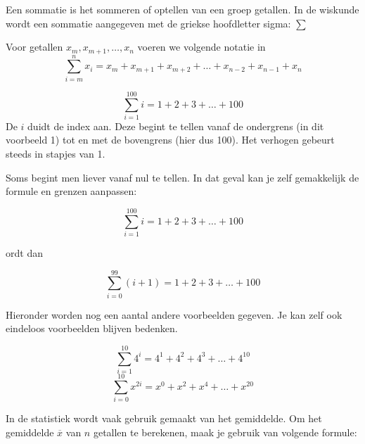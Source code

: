 Een sommatie is het sommeren of optellen van een groep getallen. 
In de wiskunde wordt een sommatie aangegeven met de griekse hoofdletter sigma: $\sum$ 

\begin{notatie}
Voor getallen $x_m,x_{m+1},\ldots,x_n$ voeren we volgende notatie in
\begin{equation*}
\sum_{i=m}^{n}x_i = x_m + x_{m+1} + x_{m+2} + \ldots + x_{n-2} + x_{n-1} + x_{n}
\end{equation*}	
\end{notatie}

\begin{voorbeeld}
	\begin{equation*}
	\sum_{i=1}^{100}i = 1+2+3+\ldots+100
	\end{equation*}
	De $i$ duidt de index aan. Deze begint te tellen vanaf de ondergrens (in dit voorbeeld 1) tot en met de bovengrens (hier dus 100). Het verhogen gebeurt steeds in stapjes van 1.
	
\end{voorbeeld}

\begin{voorbeeld}
	Soms begint men liever vanaf nul te tellen. In dat geval kan je zelf gemakkelijk de formule en grenzen aanpassen:
	
		\begin{equation*}
	\sum_{i=1}^{100}i = 1+2+3+\ldots+100
	\end{equation*}
	
ordt dan

	\begin{equation*}
\sum_{i=0}^{99} (i+1) = 1+2+3+\ldots+100
\end{equation*}

\end{voorbeeld}

Hieronder worden nog een aantal andere voorbeelden gegeven. Je kan zelf ook eindeloos voorbeelden blijven bedenken.

\begin{voorbeeld}
	\begin{equation*}
	\sum_{i=1}^{10} 4^i = 4^1+4^2+4^3+\ldots+4^{10}
	\end{equation*}
	\begin{equation*}
	\sum_{i=0}^{10} x^{2i} = x^0+x^2+x^4+\ldots+x^{20}
	\end{equation*}
\end{voorbeeld}

In de statistiek wordt vaak gebruik gemaakt van het gemiddelde. Om het gemiddelde $\overline{x}$ van $n$ getallen te berekenen, maak je gebruik van volgende formule:

